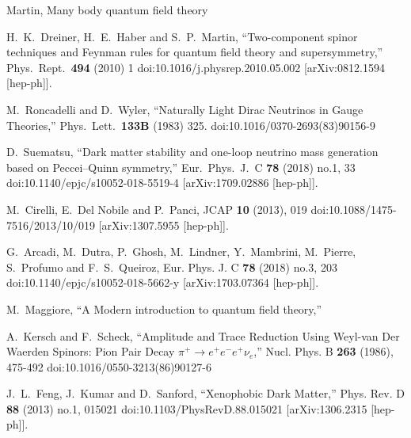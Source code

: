 \begin{thebibliography}{99}
Martin, Many body quantum field theory

  H.~K.~Dreiner, H.~E.~Haber and S.~P.~Martin,
  ``Two-component spinor techniques and Feynman rules for quantum field theory and supersymmetry,''
  Phys.\ Rept.\  {\bf 494} (2010) 1
  doi:10.1016/j.physrep.2010.05.002
  [arXiv:0812.1594 [hep-ph]].

  M.~Roncadelli and D.~Wyler,
  ``Naturally Light Dirac Neutrinos in Gauge Theories,''
  Phys.\ Lett.\  {\bf 133B} (1983) 325.
  doi:10.1016/0370-2693(83)90156-9
  
  D.~Suematsu,
  ``Dark matter stability and one-loop neutrino mass generation based on Peccei–Quinn symmetry,''
  Eur.\ Phys.\ J.\ C {\bf 78} (2018) no.1,  33
  doi:10.1140/epjc/s10052-018-5519-4
  [arXiv:1709.02886 [hep-ph]].


M.~Cirelli, E.~Del Nobile and P.~Panci,
JCAP \textbf{10} (2013), 019
doi:10.1088/1475-7516/2013/10/019
[arXiv:1307.5955 [hep-ph]].

G.~Arcadi, M.~Dutra, P.~Ghosh, M.~Lindner, Y.~Mambrini, M.~Pierre, S.~Profumo and F.~S.~Queiroz,
Eur. Phys. J. C \textbf{78} (2018) no.3, 203
doi:10.1140/epjc/s10052-018-5662-y
[arXiv:1703.07364 [hep-ph]].

M.~Maggiore,
``A Modern introduction to quantum field theory,''

A.~Kersch and F.~Scheck,
``Amplitude and Trace Reduction Using Weyl-van Der Waerden Spinors: Pion Pair Decay $\pi^+ \to e^+ e^- e^+ \nu_e$,''
Nucl. Phys. B \textbf{263} (1986), 475-492
doi:10.1016/0550-3213(86)90127-6

J.~L.~Feng, J.~Kumar and D.~Sanford,
``Xenophobic Dark Matter,''
Phys. Rev. D \textbf{88} (2013) no.1, 015021
doi:10.1103/PhysRevD.88.015021
[arXiv:1306.2315 [hep-ph]].


\end{thebibliography}
